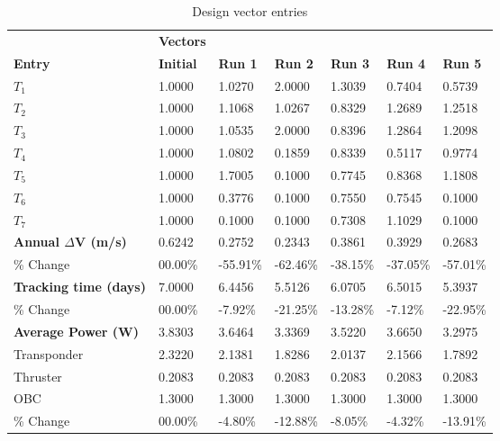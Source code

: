 \begin{table}[H]
\centering
\begin{tabular}{lllllll}
\textbf{} & \cellcolor[HTML]{EFEFEF}\textbf{Vectors} & \textbf{} & \textbf{} & \textbf{} & \textbf{} & \textbf{} \\
\rowcolor[HTML]{EFEFEF} \cellcolor[HTML]{EFEFEF}\textbf{Entry} & \cellcolor[HTML]{EFEFEF}\textbf{Initial} & \cellcolor[HTML]{EFEFEF}\textbf{Run 1} & \cellcolor[HTML]{EFEFEF}\textbf{Run 2} & \cellcolor[HTML]{EFEFEF}\textbf{Run 3} & \cellcolor[HTML]{EFEFEF}\textbf{Run 4} & \cellcolor[HTML]{EFEFEF}\textbf{Run 5} \\
$T_{1}$ & 1.0000 & 1.0270 & 2.0000 & 1.3039 & 0.7404 & 0.5739 \\
$T_{2}$ & 1.0000 & 1.1068 & 1.0267 & 0.8329 & 1.2689 & 1.2518 \\
$T_{3}$ & 1.0000 & 1.0535 & 2.0000 & 0.8396 & 1.2864 & 1.2098 \\
$T_{4}$ & 1.0000 & 1.0802 & 0.1859 & 0.8339 & 0.5117 & 0.9774 \\
$T_{5}$ & 1.0000 & 1.7005 & 0.1000 & 0.7745 & 0.8368 & 1.1808 \\
$T_{6}$ & 1.0000 & 0.3776 & 0.1000 & 0.7550 & 0.7545 & 0.1000 \\
$T_{7}$ & 1.0000 & 0.1000 & 0.1000 & 0.7308 & 1.1029 & 0.1000 \\
\rowcolor[HTML]{EFEFEF} 
\cellcolor[HTML]{EFEFEF}\textbf{Annual $\Delta \boldsymbol{V}$ (m/s)} & \cellcolor[HTML]{EFEFEF}0.6242 & 0.2752 & 0.2343 & 0.3861 & 0.3929 & 0.2683 \\
\% Change & 00.00\% &-55.91\% & -62.46\% & -38.15\% & -37.05\% & -57.01\% \\
\rowcolor[HTML]{EFEFEF} 
\cellcolor[HTML]{EFEFEF}\textbf{Tracking time (days)} & \cellcolor[HTML]{EFEFEF}7.0000 & 6.4456 & 5.5126 & 6.0705 & 6.5015 & 5.3937 \\
\% Change & 00.00\% &-7.92\% & -21.25\% & -13.28\% & -7.12\% & -22.95\% \\
\rowcolor[HTML]{EFEFEF} 
\cellcolor[HTML]{EFEFEF}\textbf{Average Power (W)} & \cellcolor[HTML]{EFEFEF}3.8303 & 3.6464 & 3.3369 & 3.5220 & 3.6650 & 3.2975 \\
Transponder & 2.3220 & 2.1381 & 1.8286 & 2.0137 & 2.1566 & 1.7892 \\
Thruster & 0.2083 & 0.2083 & 0.2083 & 0.2083 & 0.2083 & 0.2083 \\
OBC & 1.3000 & 1.3000 & 1.3000 & 1.3000 & 1.3000 & 1.3000 \\
\% Change & 00.00\% &-4.80\% & -12.88\% & -8.05\% & -4.32\% & -13.91\% \\
\end{tabular}
\caption{Design vector entries}
\label{tab:DesignVectorEntries_default28dur1len3intPropulsion}
\end{table}